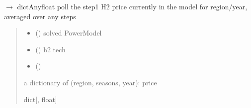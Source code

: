 \documentclass[letterpaper,10pt,english]{sphinxmanual}
\begin{document}
\begin{fulllineitems}
\label{\detokenize{src.integrator.utilities:src.integrator.utilities.poll_h2_prices_from_elec}}
\pysigstartsignatures
\pysiglinewithargsret
{}
{\sphinxparamcomma {}\sphinxparamcomma {}}
{{ $\rightarrow$ dict\DUrole{p}{{[}}Anyfloat\DUrole{p}{{]}}}}
\pysigstopsignatures
\sphinxAtStartPar
poll the step\sphinxhyphen{}1 H2 price currently in the model for region/year, averaged over any steps
\begin{quote}\begin{description}
\begin{itemize}
\item {} 
\sphinxAtStartPar
{} ({\hyperref[\detokenize{src.models.electricity.scripts.electricity_model:src.models.electricity.scripts.electricity_model.PowerModel}]{}}) \textendash{} solved PowerModel

\item {} 
\sphinxAtStartPar
{} () \textendash{} h2 tech

\item {} 
\sphinxAtStartPar
{} ()

\end{itemize}

\sphinxAtStartPar
a dictionary of (region, seasons, year): price

\sphinxAtStartPar
dict{[}, float{]}

\end{description}\end{quote}

\end{fulllineitems}

\end{document}
